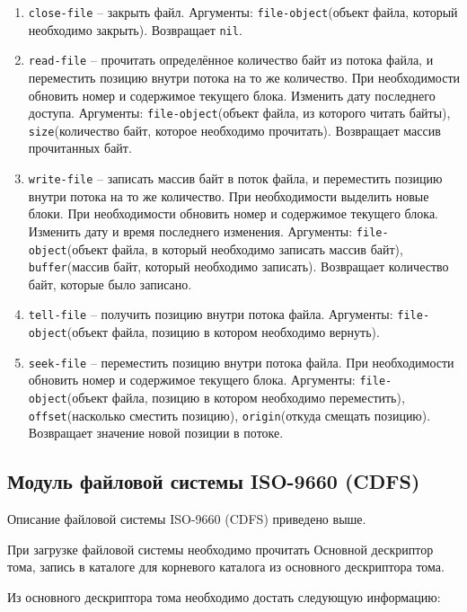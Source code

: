 \begin{enumerate}
	\begin{enumerate}
	\item \texttt{close-file} -- закрыть файл. Аргументы: \texttt{file-object}(объект файла, который необходимо закрыть). Возвращает \texttt{nil}.
	\item \texttt{read-file} -- прочитать определённое количество байт из потока файла, и переместить позицию внутри потока на то же количество. При необходимости обновить номер и содержимое текущего блока. Изменить дату последнего доступа. Аргументы: \texttt{file-object}(объект файла, из которого читать байты), \texttt{size}(количество байт, которое необходимо прочитать). Возвращает массив прочитанных байт.
	\item \texttt{write-file} -- записать массив байт в поток файла, и переместить позицию внутри потока на то же количество. При необходимости выделить новые блоки. При необходимости обновить номер и содержимое текущего блока. Изменить дату и время последнего изменения. Аргументы: \texttt{file-object}(объект файла, в который необходимо записать массив байт), \texttt{buffer}(массив байт, который необходимо записать). Возвращает количество байт, которые было записано.
	\item \texttt{tell-file} -- получить позицию внутри потока файла. Аргументы: \texttt{file-object}(объект файла, позицию в котором необходимо вернуть).
	\item \texttt{seek-file} -- переместить позицию внутри потока файла. При необходимости обновить номер и содержимое текущего блока. Аргументы: \texttt{file-object}(объект файла, позицию в котором необходимо переместить), \texttt{offset}(насколько сместить позицию), \texttt{origin}(откуда смещать позицию). Возвращает значение новой позиции в потоке.	
	\end{enumerate}

\end{enumerate}

\subsection{Модуль файловой системы ISO-9660 (CDFS)}

Описание файловой системы ISO-9660 (CDFS) приведено выше.

При загрузке файловой системы необходимо прочитать Основной дескриптор тома, запись в каталоге для корневого каталога из основного дескриптора тома.

Из основного дескриптора тома необходимо достать следующую информацию:

